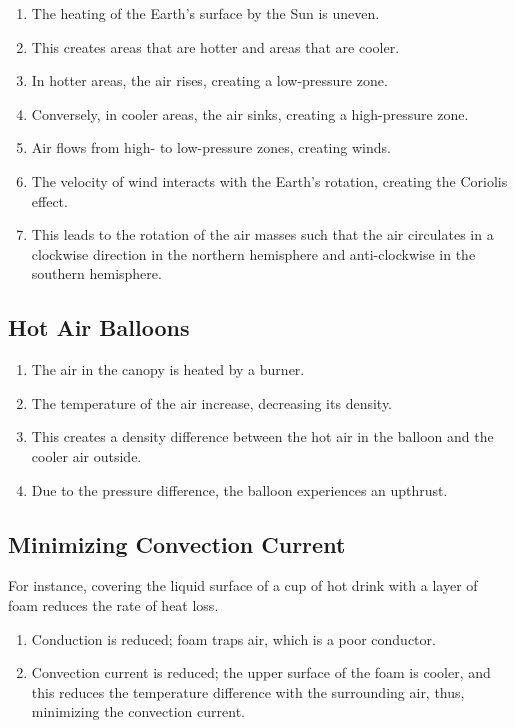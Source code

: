 \documentclass[a4paper,12pt]{article}
\begin{document}
\begin{enumerate}
  \item The heating of the Earth's surface by the Sun is uneven.
  \item This creates areas that are hotter and areas that are cooler.
  \item In hotter areas, the air rises, creating a low-pressure zone.
  \item Conversely, in cooler areas, the air sinks, creating a high-pressure zone.
  \item Air flows from high- to low-pressure zones, creating winds.
  \item The velocity of wind interacts with the Earth's rotation, creating the Coriolis effect.
  \item This leads to the rotation of the air masses such that the air circulates in a clockwise direction in the northern hemisphere and anti-clockwise in the southern hemisphere.
\end{enumerate}

\pagebreak

\subsection{Hot Air Balloons}

\begin{enumerate}
  \item The air in the canopy is heated by a burner.
  \item The temperature of the air increase, decreasing its density.
  \item This creates a density difference between the hot air in the balloon and the cooler air outside.
  \item Due to the pressure difference, the balloon experiences an upthrust.
\end{enumerate}

\subsection{Minimizing Convection Current}

For instance, covering the liquid surface of a cup of hot drink with a layer of foam reduces the rate of heat loss.
\begin{enumerate}
  \item Conduction is reduced; foam traps air, which is a poor conductor.
  \item Convection current is reduced; the upper surface of the foam is cooler, and this reduces the temperature difference with the surrounding air, thus, minimizing the convection current.
\end{enumerate}
\end{document}
